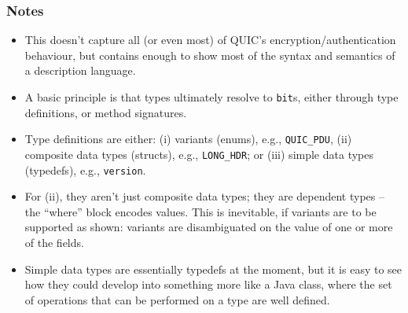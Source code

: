 \documentclass[10pt,a4paper]{article}
\begin{document}
\subsubsection*{Notes}
\begin{itemize}
	\item This doesn't capture all (or even most) of QUIC's encryption/authentication
		  behaviour, but contains enough to show most of the syntax and semantics of a
          description language.
	\item A basic principle is that types ultimately resolve to \texttt{bit}s, either
	      through type definitions, or method signatures.
	\item Type definitions are either: (i) variants (enums), e.g., \texttt{QUIC\_PDU},
	      (ii) composite data types (structs), e.g., \texttt{LONG\_HDR}; or (iii) simple
	      data types (typedefs), e.g., \texttt{version}.
	\item For (ii), they aren't just composite data types; they are dependent types
	      -- the ``where'' block encodes values. This is inevitable, if variants are to be
	      supported as shown: variants are disambiguated on the value of one or more of
	      the fields.
	\item Simple data types are essentially typedefs at the moment, but it is easy to see
	      how they could develop into something more like a Java class, where the set of
	      operations that can be performed on a type are well defined.
\end{itemize}



\end{document}
